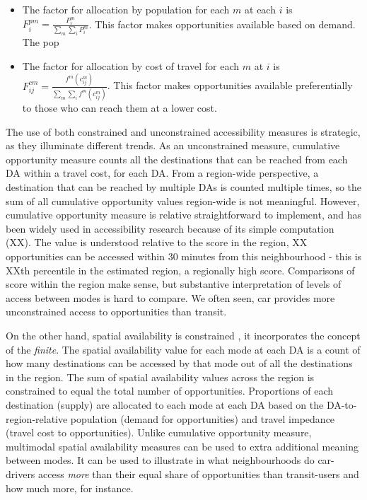 \documentclass[
  super,
  preprint,
  3p]{elsarticle}
\providecommand{\tightlist}{%
  \setlength{\itemsep}{0pt}\setlength{\parskip}{0pt}}\usepackage{longtable,booktabs,array}
\begin{document}
\begin{itemize}
\tightlist
\item
  The factor for allocation by population for each \(m\) at each \(i\)
  is \(F^{pm}_{i} = \frac{P_{i}^m}{\sum_{m}\sum_{i} P_{i}^m}\). This
  factor makes opportunities available based on demand. The pop
\item
  The factor for allocation by cost of travel for each \(m\) at \(i\) is
  \(F_{ij}^{cm} = \frac{f^m(c_{ij}^m)}{\sum_{m} \sum_{i} f^m(c_{ij}^m)}\).
  This factor makes opportunities available preferentially to those who
  can reach them at a lower cost.
\end{itemize}

The use of both constrained and unconstrained accessibility measures is
strategic, as they illuminate different trends. As an unconstrained
measure, cumulative opportunity measure counts all the destinations that
can be reached from each DA within a travel cost, for each DA. From a
region-wide perspective, a destination that can be reached by multiple
DAs is counted multiple times, so the sum of all cumulative opportunity
values region-wide is not meaningful. However, cumulative opportunity
measure is relative straightforward to implement, and has been widely
used in accessibility research because of its simple computation (XX).
The value is understood relative to the score in the region, XX
opportunities can be accessed within 30 minutes from this neighbourhood
- this is XXth percentile in the estimated region, a regionally high
score. Comparisons of score within the region make sense, but
substantive interpretation of levels of access between modes is hard to
compare. We often seen, car provides more unconstrained access to
opportunities than transit.

On the other hand, spatial availability is constrained
\citep{soukhovIntroducingSpatialAvailability2023}, it incorporates the
concept of the \emph{finite}. The spatial availability value for each
mode at each DA is a count of how many destinations can be accessed by
that mode out of all the destinations in the region. The sum of spatial
availability values across the region is constrained to equal the total
number of opportunities. Proportions of each destination (supply) are
allocated to each mode at each DA based on the DA-to-region-relative
population (demand for opportunities) and travel impedance (travel cost
to opportunities). Unlike cumulative opportunity measure, multimodal
spatial availability measures can be used to extra additional meaning
between modes. It can be used to illustrate in what neighbourhoods do
car-drivers access \emph{more} than their equal share of opportunities
than transit-users and how much more, for instance.
\end{document}
